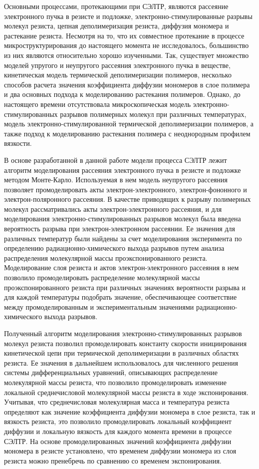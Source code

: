 Основными процессами, протекающими при СЭЛТР, являются рассеяние электронного пучка в резисте и подложке, электронно-стимулированные разрывы молекул резиста, цепная деполимеризация резиста, диффузия мономера и растекание резиста. Несмотря на то, что их совместное протекание в процессе микроструктурирования до настоящего момента не исследовалось, большинство из них являются относительно хорошо изученными. Так, существует множество моделей упругого и неупругого рассеяния электронного пучка в веществе, кинетическая модель термической деполимеризации полимеров, несколько способов расчета значения коэффициента диффузии мономеров в слое полимера и два основных подхода к моделированию растекания полимеров. Однако, до настоящего времени отсутствовала микроскопическая модель электронно-стимулированных разрывов полимерных молекул при различных температурах, модель электронно-стимулированной термической деполимеризации полимеров, а также подход к моделированию растекания полимера с неоднородным профилем вязкости.

В основе разработанной в данной работе модели процесса СЭЛТР лежит алгоритм моделирования рассеяния электронного пучка в резисте и подложке методом Монте-Карло. Используемая в нем модель неупругого рассеяния позволяет промоделировать акты электрон-электронного, электрон-фононного и электрон-поляронного рассеяния. В качестве приводящих к разрыву полимерных молекул рассматривались акты электрон-электронного рассеяния, и для моделирования электронно-стимулированных разрывов молекул была введена вероятность разрыва при электрон-электронном рассеянии. Ее значения для различных температур были найдены за счет моделирования эксперимента по определению радиационно-химического выхода разрывов путем анализа распределения молекулярной массы проэкспонированного резиста. Моделирование слоя резиста и актов электрон-электронного рассеяния в нем позволило промоделировать распределение молекулярной массы проэкспонированного резиста при различных значениях вероятности разрыва и для каждой температуры подобрать значение, обеспечивающее соответствие между промоделированным и экспериментальным значениями радиационно-химического выхода разрывов.

Полученный алгоритм моделирования электронно-стимулированных разрывов молекул резиста позволил промоделировать константу скорости инициирования кинетической цепи при термической деполимеризации в различных областях резиста. Ее значения в дальнейшем использовалось для численного решения системы дифференциальных уравнений, описывающих распределение молекулярной массы резиста, что позволило промоделировать изменение локальной среднечисловой молекулярной массы резиста в ходе экспонирования. Учитывая, что среднечисловая молекулярная масса и температура резиста определяют как значение коэффициента диффузии мономера в слое резиста, так и вязкость резиста, это позволило промоделировать локальный коэффициент диффузии и локальную вязкость для каждого момента времени в процессе СЭЛТР. На основе промоделированных значений коэффициента диффузии мономера в резисте установлено, что временем диффузии мономера из слоя резиста можно пренебречь по сравнению со временем экспонирования.


